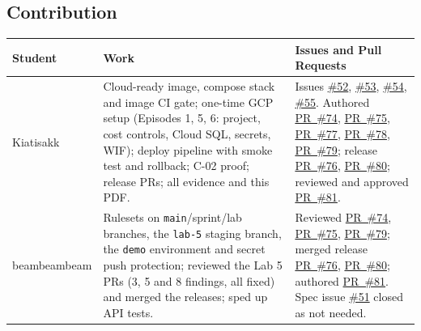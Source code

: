 \documentclass[11pt,a4paper]{article}
\newcommand{\repo}{https://github.com/beambeambeam/claimflow}
\newcommand{\pr}[1]{\href{\repo/pull/#1}{PR~\##1}}
\newcommand{\issue}[1]{\href{\repo/issues/#1}{\##1}}
\begin{document}
\subsection*{Contribution}
\small
\begin{tabularx}{\textwidth}{@{}p{2.2cm}>{\raggedright\arraybackslash}X>{\raggedright\arraybackslash}X@{}}
\toprule
Student & Work & Issues and Pull Requests \\
\midrule
Kiatisakk & Cloud-ready image, compose stack and image CI gate; one-time GCP setup (Episodes 1, 5, 6: project, cost controls, Cloud SQL, secrets, WIF); deploy pipeline with smoke test and rollback; C-02 proof; release PRs; all evidence and this PDF. &
Issues \issue{52}, \issue{53}, \issue{54}, \issue{55}. Authored \pr{74}, \pr{75}, \pr{77}, \pr{78}, \pr{79}; release \pr{76}, \pr{80}; reviewed and approved \pr{81}. \\
beambeambeam & Rulesets on \texttt{main}/sprint/lab branches, the \texttt{lab-5} staging branch, the \texttt{demo} environment and secret push protection; reviewed the Lab 5 PRs (3, 5 and 8 findings, all fixed) and merged the releases; sped up API tests. &
Reviewed \pr{74}, \pr{75}, \pr{79}; merged release \pr{76}, \pr{80}; authored \pr{81}. Spec issue \issue{51} closed as not needed. \\
\bottomrule
\end{tabularx}
\end{document}
